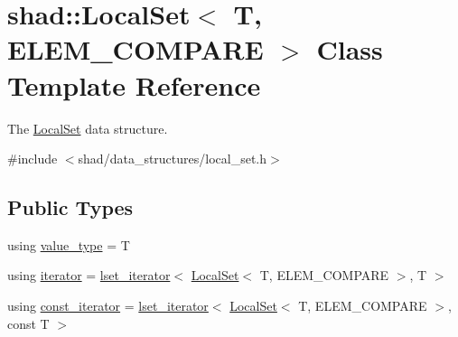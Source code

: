 \hypertarget{classshad_1_1LocalSet}{\section{shad\-:\-:Local\-Set$<$ T, E\-L\-E\-M\-\_\-\-C\-O\-M\-P\-A\-R\-E $>$ Class Template Reference}
\label{classshad_1_1LocalSet}
}


The \hyperlink{classshad_1_1LocalSet}{Local\-Set} data structure.  




{\ttfamily \#include $<$shad/data\-\_\-structures/local\-\_\-set.\-h$>$}

\subsection*{Public Types}
\begin{DoxyCompactItemize}
\item 
using \hyperlink{classshad_1_1LocalSet_a2116351b475e6f8cb21f78f11486e9e7}{value\-\_\-type} = T
\item 
using \hyperlink{classshad_1_1LocalSet_aea5fcaed21331e4dcb23811bc3f59e0d}{iterator} = \hyperlink{classshad_1_1lset__iterator}{lset\-\_\-iterator}$<$ \hyperlink{classshad_1_1LocalSet}{Local\-Set}$<$ T, E\-L\-E\-M\-\_\-\-C\-O\-M\-P\-A\-R\-E $>$, T $>$
\item 
using \hyperlink{classshad_1_1LocalSet_a3a1104a2552f91dcdf37b057440ba182}{const\-\_\-iterator} = \hyperlink{classshad_1_1lset__iterator}{lset\-\_\-iterator}$<$ \hyperlink{classshad_1_1LocalSet}{Local\-Set}$<$ T, E\-L\-E\-M\-\_\-\-C\-O\-M\-P\-A\-R\-E $>$, const T $>$
\end{DoxyCompactItemize}
